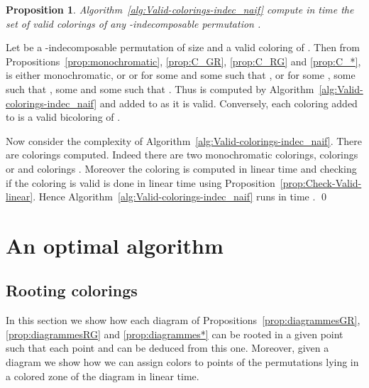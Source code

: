 \documentclass[11pt]{article}
\newenvironment{pf}{{\em \noindent Proof:}}{ \hfill \qed\smallskip}
\newtheorem{prop}[thm]{Proposition}
\begin{document}
\begin{prop}
Algorithm~\ref{alg:Valid-colorings-indec_naif} compute in time  the set of valid colorings of any -indecomposable permutation .
\end{prop}

\begin{pf}
Let  be a -indecomposable permutation of size  and  a valid coloring of .
Then from Propositions~\ref{prop:monochromatic}, \ref{prop:C_GR}, \ref{prop:C_RG} and \ref{prop:C_*}, 
 is either monochromatic, or  or  for some  and some  such that , 
or  for some , some  such that , 
some  and some  such that .
Thus  is computed by Algorithm~\ref{alg:Valid-colorings-indec_naif} and added to  as it is valid.
Conversely, each coloring added to  is a valid bicoloring of .

Now consider the complexity of Algorithm~\ref{alg:Valid-colorings-indec_naif}.
There are  colorings computed. 
Indeed there are two monochromatic colorings,  colorings  or 
and  colorings .
Moreover the coloring is computed in linear time and checking if the coloring is valid is done in linear time 
using Proposition~\ref{prop:Check-Valid-linear}.
Hence Algorithm~\ref{alg:Valid-colorings-indec_naif} runs in time .
\end{pf}


\section{An optimal algorithm} \label{sec:optimalAlgo}

\subsection{Rooting colorings} \label{ssec:root}

In this section we show how each diagram of Propositions~\ref{prop:diagrammesGR}, \ref{prop:diagrammesRG} and \ref{prop:diagrammes*} can be rooted in a given point such that each point  and  can be deduced from this one. 
Moreover, given a diagram we show how we can assign colors to points of the permutations lying in a colored zone of the diagram in linear time.
\end{document}
